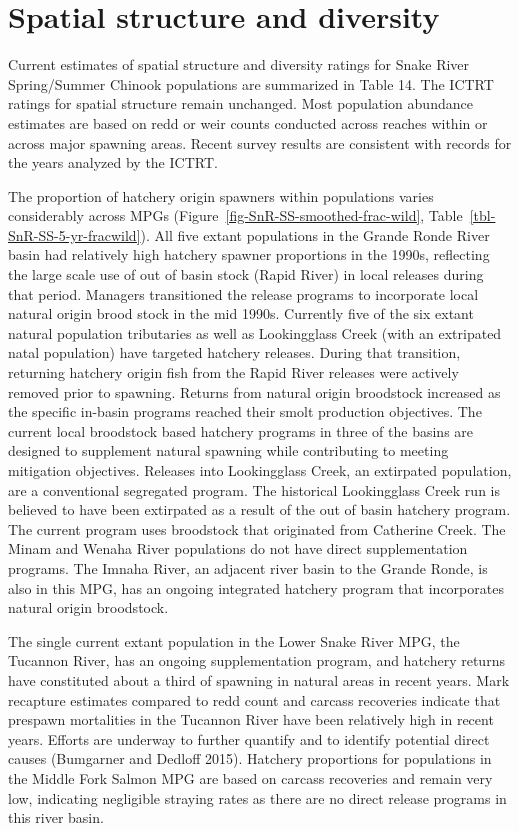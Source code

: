 \documentclass[
  letterpaper,
  oneside,
  open=any]{scrbook}
\begin{document}
\hypertarget{spatial-structure-and-diversity-2}{%
\section{Spatial structure and
diversity}\label{spatial-structure-and-diversity-2}}

Current estimates of spatial structure and diversity ratings for Snake
River Spring/Summer Chinook populations are summarized in Table 14. The
ICTRT ratings for spatial structure remain unchanged. Most population
abundance estimates are based on redd or weir counts conducted across
reaches within or across major spawning areas. Recent survey results are
consistent with records for the years analyzed by the ICTRT.

The proportion of hatchery origin spawners within populations varies
considerably across MPGs (Figure~\ref{fig-SnR-SS-smoothed-frac-wild},
Table~\ref{tbl-SnR-SS-5-yr-fracwild}). All five extant populations in
the Grande Ronde River basin had relatively high hatchery spawner
proportions in the 1990s, reflecting the large scale use of out of basin
stock (Rapid River) in local releases during that period. Managers
transitioned the release programs to incorporate local natural origin
brood stock in the mid 1990s. Currently five of the six extant natural
population tributaries as well as Lookingglass Creek (with an extripated
natal population) have targeted hatchery releases. During that
transition, returning hatchery origin fish from the Rapid River releases
were actively removed prior to spawning. Returns from natural origin
broodstock increased as the specific in-basin programs reached their
smolt production objectives. The current local broodstock based hatchery
programs in three of the basins are designed to supplement natural
spawning while contributing to meeting mitigation objectives. Releases
into Lookingglass Creek, an extirpated population, are a conventional
segregated program. The historical Lookingglass Creek run is believed to
have been extirpated as a result of the out of basin hatchery program.
The current program uses broodstock that originated from Catherine
Creek. The Minam and Wenaha River populations do not have direct
supplementation programs. The Imnaha River, an adjacent river basin to
the Grande Ronde, is also in this MPG, has an ongoing integrated
hatchery program that incorporates natural origin broodstock.

The single current extant population in the Lower Snake River MPG, the
Tucannon River, has an ongoing supplementation program, and hatchery
returns have constituted about a third of spawning in natural areas in
recent years. Mark recapture estimates compared to redd count and
carcass recoveries indicate that prespawn mortalities in the Tucannon
River have been relatively high in recent years. Efforts are underway to
further quantify and to identify potential direct causes (Bumgarner and
Dedloff 2015). Hatchery proportions for populations in the Middle Fork
Salmon MPG are based on carcass recoveries and remain very low,
indicating negligible straying rates as there are no direct release
programs in this river basin.
\end{document}
